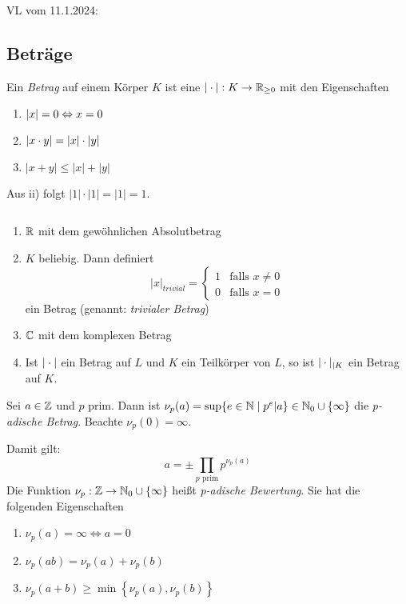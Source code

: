 \documentclass[../main.tex]{subfiles}
\begin{document}
\begin{flushright}
VL vom 11.1.2024:
\end{flushright}
\subsection{Beträge}
\begin{definition} %
    Ein \emph{Betrag} auf einem Körper $K$ ist eine $|\cdot|: K\rightarrow \mathbb{R}_{\geq0}$ mit den Eigenschaften
    \begin{enumerate}[label=\roman*)]
        \item $\left\vert x \right\vert = 0 \Leftrightarrow x =0$
        \item $\left\vert x\cdot y \right\vert = |x| \cdot |y|$
        \item $|x+y| \leq |x| + |y|$
    \end{enumerate}
    Aus ii) folgt $|1|\cdot |1| =|1| = 1$.
\end{definition}
\begin{example}$ $
    \begin{enumerate}[label=\roman*)] %
        \item $\mathbb{R}$ mit dem gewöhnlichen Absolutbetrag
        \item $K$ beliebig. Dann definiert 
        $$|x|_{trivial} = \begin{cases}
            1 & \text{falls }x\neq 0\\
            0 & \text{falls }x= 0
        \end{cases}$$
        ein Betrag (genannt: \emph{trivialer Betrag})
        \item $\mathbb{C}$ mit dem komplexen Betrag
        \item Ist $|\cdot|$ ein Betrag auf $L$ und $K$ ein Teilkörper von $L$, so ist $|\cdot|_{|K}$ ein Betrag auf $K$.
    \end{enumerate}
\end{example}
\begin{definition} 
    Sei $a\in \mathbb{Z}$ und $p$ prim. Dann ist
    $\nu_p(a)= \sup\{e\in \mathbb{N}\mid p^e|a\}\in \mathbb{N}_0\cup \{\infty\}$
    die \emph{p-adische Betrag}.
Beachte $\nu_p(0) = \infty$.
\end{definition}
Damit gilt:
$$a = \pm \prod_{p\text{ prim}} p^{\nu_p(a)}$$
Die Funktion $\nu_p:\mathbb{Z}\rightarrow \mathbb{N}_0\cup \{\infty\}$ heißt \emph{p-adische Bewertung}. Sie hat die folgenden Eigenschaften
\begin{enumerate}[label=\roman*)]%
    \item $\nu_p(a) = \infty \Leftrightarrow a = 0$
    \item $\nu_p(ab) = \nu_p(a)+\nu_p(b)$
    \item $\nu_p(a+b) \geq \min\left\{\nu_p(a),\nu_p(b)\right\}$
\end{enumerate}
\end{document}
